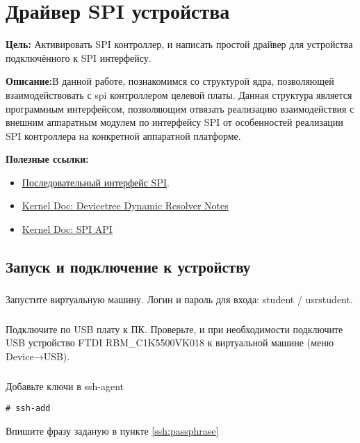 \chapter{Драйвер SPI устройства}
\textbf{Цель:} Активировать SPI контроллер, и написать простой драйвер для устройства подключённого к SPI интерфейсу.

\vspace{5mm}
\textbf{Описание:}В данной работе, познакомимся со структурой ядра, позволяющей взаимодействовать с spi контроллером целевой платы. Данная структура является программным интерфейсом, позволяющим отвязать реализацию взаимодействия с внешним аппаратным модулем по интерфейсу SPI от особенностей реализации SPI контроллера на конкретной аппаратной платформе. 

\vspace{5mm}
\textbf{Полезные ссылки:}
\begin{itemize}
	\item \href{http://www.gaw.ru/html.cgi/txt/interface/spi/index.htm}{Последовательный интерфейс SPI}.
	\item \href{https://docs.kernel.org/devicetree/dynamic-resolution-notes.html}{Kernel Doc: Devicetree Dynamic Resolver Notes}
	\item \href{https://www.kernel.org/doc/html/v4.15/driver-api/spi.html}{Kernel Doc: SPI API}	
\end{itemize}

\section{Запуск и подключение к устройству}

\subsection{}Запустите виртуальную машину. Логин и пароль для входа: student / usrstudent.

\subsection{}Подключите по USB плату к ПК. Проверьте, и при необходимости подключите USB устройство FTDI RBM\_C1K5500VK018 к виртуальной машине (меню Device→USB).

\subsection{}Добавьте ключи в ssh-agent
\begin{lstlisting}[style=bash]
	# ssh-add
\end{lstlisting}
Впишите фразу заданую в пункте \ref{ssh:passphrase}

